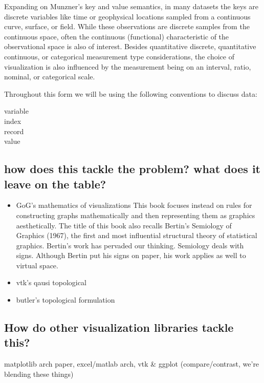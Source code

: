 \documentclass[../main.tex]{subfiles}
\begin{document}
Expanding on Munzner's key and value semantics, in many datasets the keys are discrete variables like time or geophysical locations sampled from a continuous curve, surface, or field. While these observations are discrete samples from the continuous space, often the continuous (functional) characteristic\cite{ramsayFunctionalDataAnalysis2006a,mullerFunctionalVarianceProcesses2006a} of the observational space is also of interest. Besides quantitative discrete, quantitative continuous, or categorical measurement type considerations, the choice of visualization is also influenced by the measurement being on an interval, ratio, nominal, or categorical scale. 

Throughout this form we will be using the following conventions to discuss data:

\begin{description}
    \item[variable]
    \item[index]  
    \item[record]
    \item[value]  
\end{description}

\subsection{how does this tackle the problem? what does it leave on the table?}
\begin{itemize}

    \item GoG's mathematics of visualizations
    This book focuses instead on rules for constructing graphs mathematically
and then representing them as graphics aesthetically.
The title of this book also recalls Bertin’s Semiology of Graphics (1967),
the first and most influential structural theory of statistical graphics. Bertin’s
work has pervaded our thinking. Semiology deals with signs. Although Bertin
put his signs on paper, his work applies as well to virtual space.
    \item vtk's qausi topological
    \item butler's topological formulation
\end{itemize}

\subsection{How do other visualization libraries tackle this?}
matplotlib arch paper, excel/matlab arch, 
vtk \& ggplot (compare/contrast, we're blending these things) 
\end{document}
